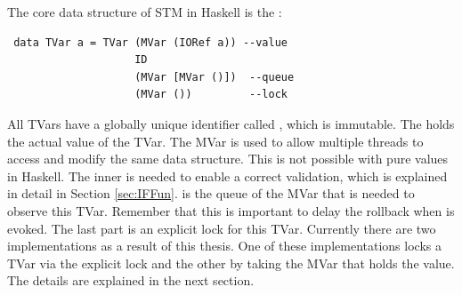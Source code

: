 The core data structure of STM in Haskell is the :
\begin{lstlisting}
 data TVar a = TVar (MVar (IORef a)) --value
                    ID
                    (MVar [MVar ()])  --queue
                    (MVar ())         --lock
\end{lstlisting}
All TVars have a globally unique identifier called , which is immutable. The  
holds the actual value of the TVar. The MVar is used to allow multiple threads to access and modify the same 
data structure. This is not possible with pure values in Haskell. The inner  is needed to enable a 
correct validation, which is explained in detail
in Section \ref{sec:IFFun}.  is the queue of the MVar that is needed to observe this TVar. 
Remember that this is important to delay the rollback when 
is evoked. The last part is an explicit lock for this TVar. Currently there are two implementations as 
a result of this thesis. One of these implementations locks a TVar via 
the explicit lock and the other by taking the MVar that holds the value. The details are explained in the next section. 

